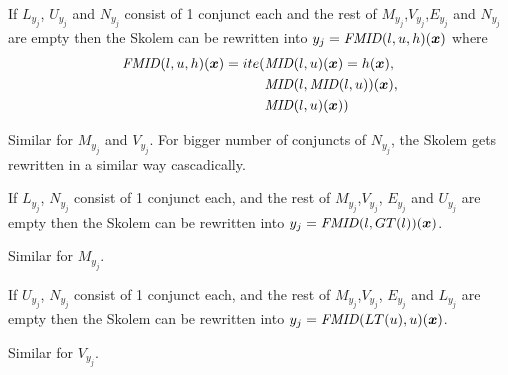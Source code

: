 \begin{lemma}
If $L_{y_j}$, $U_{y_j}$ and $N_{y_j}$ consist of 1 conjunct each and the rest of $M_{y_j} $,$V_{y_j}$,$E_{y_j}$ and $N_{y_j}$ are empty then the Skolem can be rewritten into $y_j = \mathit{FMID} (l, u, h)(\vx)$ where%
\begin{align}
\mathit{FMID}(l, u, h) (\vx) = ite (&\mathit{MID}(l, u) (\vx) = h(\vx),  \notag \\
                          &\mathit{MID}(l, \mathit{MID}(l, u)) (\vx), \notag \\
                          &\mathit{MID}(l, u) (\vx)) \notag 
\end{align}
\end{lemma}
Similar for $M_{y_j}$ and $V_{y_j}$. 
For bigger number of conjuncts of $N_{y_j}$, the Skolem gets rewritten in a similar way cascadically.


\begin{lemma}
If $L_{y_j}$, $N_{y_j}$  consist of 1 conjunct each, and the rest of $M_{y_j} $,$V_{y_j}$, $E_{y_j}$ and $U_{y_j}$ are empty then the Skolem can be rewritten into $y_j = \mathit{FMID} (l, GT(l))(\vx)$. 
\end{lemma}
Similar for $M_{y_j}$.


\begin{lemma}
If $U_{y_j}$, $N_{y_j}$  consist of 1 conjunct each, and the rest of $M_{y_j} $,$V_{y_j}$, $E_{y_j}$ and $L_{y_j}$ are empty then the Skolem can be rewritten into $y_j = \mathit{FMID} (LT(u), u)(\vx)$. 
\end{lemma}
Similar for $V_{y_j}$.
